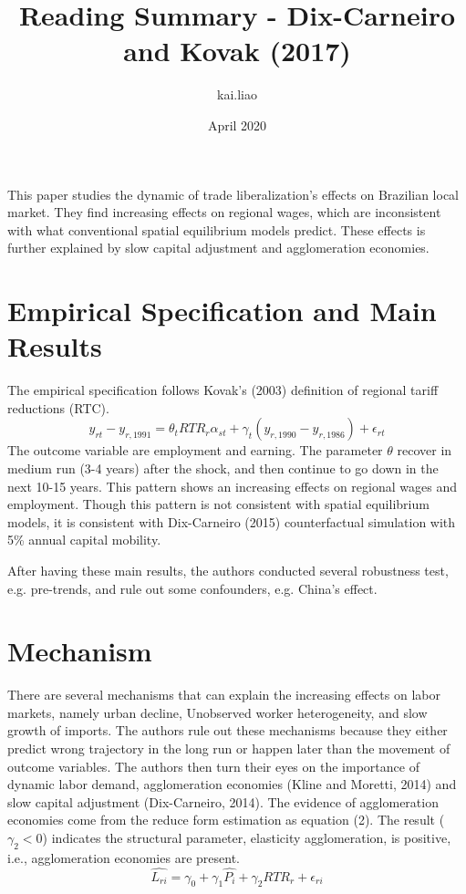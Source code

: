 \documentclass{article}
\title{Reading Summary - Dix-Carneiro and Kovak (2017)}
\author{kai.liao }
\date{April 2020}
\begin{document}
\maketitle
This paper studies the dynamic of trade liberalization's effects on Brazilian local market. They find increasing effects on regional wages, which are inconsistent with what conventional spatial equilibrium models predict. These effects is further explained by slow capital adjustment and agglomeration economies.
\section{Empirical Specification and Main Results}
The empirical specification follows Kovak's (2003) definition of regional tariff reductions (RTC).
\begin{equation}
    y_{rt} - y_{r, 1991} = \theta_t RTR_r \alpha_{st} + \gamma_t(y_{r, 1990}-y_{r, 1986}) + \epsilon_{rt}
\end{equation}
The outcome variable are employment and earning.
The parameter $\theta$ recover in medium run (3-4 years) after the shock, and then continue to go down in the next 10-15 years. This pattern shows an increasing effects on regional wages and employment. Though this pattern is not consistent with spatial equilibrium models, it is consistent with Dix-Carneiro (2015) counterfactual simulation with 5\% annual capital mobility.

After having these main results, the authors conducted several robustness test, e.g. pre-trends, and rule out some confounders, e.g. China's effect.  

\section{Mechanism}
There are several mechanisms that can explain the increasing effects on labor markets, namely urban decline, Unobserved worker heterogeneity, and slow growth of imports. The authors rule out these mechanisms because they either predict wrong trajectory in the long run or happen later than the movement of outcome variables. The authors then turn their eyes on the importance of dynamic labor demand, agglomeration economies (Kline and Moretti, 2014) and slow capital adjustment (Dix-Carneiro, 2014). The evidence of agglomeration economies come from the reduce form estimation as equation (2). The result ($\gamma_2 < 0 $) indicates the structural parameter, elasticity agglomeration, is positive, i.e., agglomeration economies are present. 
\begin{equation}
    \hat{L_{ri}} = \gamma_0 +\gamma_1\hat{P_i} +\gamma_2RTR_r + \epsilon_{ri}
\end{equation}
\end{document}
